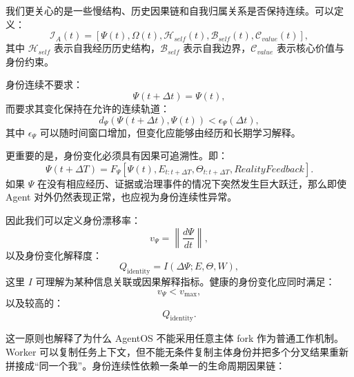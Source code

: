 我们更关心的是一些慢结构、历史因果链和自我归属关系是否保持连续。可以定义：
\begin{equation}
\mathcal{I}_A(t)
=
\left[
\Psi(t),
\Omega(t),
\mathcal{H}_{self}(t),
\mathcal{B}_{self}(t),
\mathcal{C}_{value}(t)
\right],
\end{equation}
其中 $\mathcal{H}_{self}$ 表示自我经历历史结构，$\mathcal{B}_{self}$ 表示自我边界，$\mathcal{C}_{value}$ 表示核心价值与身份约束。

身份连续不要求：
\begin{equation}
\Psi(t+\Delta t)=\Psi(t),
\end{equation}
而要求其变化保持在允许的连续轨道：
\begin{equation}
d_\Psi
\left(
\Psi(t+\Delta t),
\Psi(t)
\right)
<
\epsilon_\Psi(\Delta t),
\end{equation}
其中 $\epsilon_\Psi$ 可以随时间窗口增加，但变化应能够由经历和长期学习解释。

更重要的是，身份变化必须具有因果可追溯性。即：
\begin{equation}
\Psi(t+\Delta T)
=
F_\Psi
\left[
\Psi(t),
E_{t:t+\Delta T},
\Theta_{t:t+\Delta T},
RealityFeedback
\right].
\end{equation}
如果 $\Psi$ 在没有相应经历、证据或治理事件的情况下突然发生巨大跃迁，那么即使 Agent 对外仍然表现正常，也应视为身份连续性异常。

因此我们可以定义身份漂移率：
\begin{equation}
v_\Psi
=
\left\|
\frac{d\Psi}{dt}
\right\|,
\end{equation}
以及身份变化解释度：
\begin{equation}
Q_{\mathrm{identity}}
=
I
\left(
\Delta\Psi;
E,\Theta,W
\right),
\end{equation}
这里 $I$ 可理解为某种信息关联或因果解释指标。健康的身份变化应同时满足：
\begin{equation}
v_\Psi<v_{\max},
\end{equation}
以及较高的：
\begin{equation}
Q_{\mathrm{identity}}.
\end{equation}

这一原则也解释了为什么 AgentOS 不能采用任意主体 fork 作为普通工作机制。Worker 可以复制任务上下文，但不能无条件复制主体身份并把多个分叉结果重新拼接成“同一个我”。身份连续性依赖一条单一的生命周期因果链：
\begin{statementbox}
\centering
{}
\end{statementbox}

